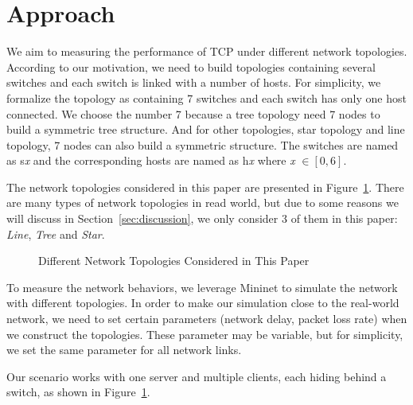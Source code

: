 \section{Approach} \label{sec:approach}

We aim to measuring the performance of TCP under different network topologies.
According to our motivation, we need to build topologies containing several
switches and each switch is linked with a number of hosts. For simplicity,
we formalize the topology as containing 7 switches and each switch has only 
one host connected. We choose the number 7 because a tree topology need 7 nodes
to build a symmetric tree structure. And for other topologies, \eg star topology
and line topology, 7 nodes can also build a symmetric structure. The switches are named
as s{\it x} and the corresponding hosts are named as h{\it x} where {\it x} $\in [0, 6]$.

The network topologies considered in this paper are presented in Figure~\ref{fig:topo}.
There are many types of network topologies in read world, but
due to some reasons we will discuss in Section~\ref{sec:discussion}, we only consider
3 of them in this paper: {\it Line}, {\it Tree} and {\it Star}. 

\begin{figure}[ht]
\centering
{}




\caption{Different Network Topologies Considered in This Paper} 
\label{fig:topo}
\end{figure}

To measure the network behaviors, we leverage Mininet \cite{Mininet:official}
to simulate the network with different topologies. In order to make our simulation
close to the real-world network, we need to set certain parameters (\eg network 
delay, packet loss rate) when we construct the topologies. These parameter may be
variable, but for simplicity, we set the same parameter for all network links. 

Our scenario works with one server and multiple clients, each hiding behind a 
switch, as shown in Figure~\ref{fig:topo}.

